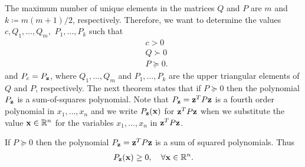 \documentclass[a4paper,12pt,twoside,BCOR=10mm]{scrbook}
\begin{document}
The maximum number of unique elements in the matrices $Q$ and $P$ are $m$ and $k \coloneqq m(m + 1) / 2$, respectively.
Therefore, we want to determine the values $c, Q_1, \ldots, Q_m,$ $P_1, \ldots, P_k$ such that
\begin{align*}
    &c > 0\\
    &Q
    \succ 0\\
    &P
    \succeq 0.
\end{align*}
and $P_c = P_{\mathbf{z}}$, where $Q_1, \ldots, Q_m$ and $P_1, \ldots, P_k$ are the upper triangular elements of $Q$ and $P$, respectively. The next theorem states that if $P \succeq 0$ then the polynomial $P_{\mathbf{z}}$ is a sum-of-squares polynomial. Note that $P_{\mathbf{z}} = \mathbf{z}^T P \mathbf{z}$ is a fourth order polynomial in $x_1, \ldots, x_n$ and we write $P_{\mathbf{z}}(\mathbf{x})$ for $\mathbf{z}^T P \mathbf{z}$ when we substitute the value $\mathbf{x} \in \mathbb{R}^{n}$ for the variables $x_1, \ldots, x_n$ in $\mathbf{z}^T P \mathbf{z}$.
\begin{theorem}
If $P \succeq 0$ then the polynomial $P_{\mathbf{z}} = \mathbf{z}^T P \mathbf{z}$ is a sum of squared polynomials. Thus \begin{align*}
    P_{\mathbf{z}}(\mathbf{x}) \geq 0, \quad \forall \mathbf{x} \in \mathbb{R}^{n}.
\end{align*}
\end{theorem}
\end{document}
